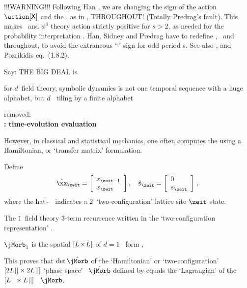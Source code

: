 \begin{description}
 {
                    {\color{red}
!!!WARNING!!!
Following Han , we are changing the sign of the
action $\action[\Xx]$ and the {\jacobianOrb}, as in ,
THROUGHOUT! (Totally Predrag's fault).
This makes \catlatt\ and {$\phi^4$} theory action strictly positive
for
${s}>2$, as
needed for the probability interpretation .
                    }
Han, Sidney and Predrag have to redefine
\templatt, \catlatt\ and \henlatt\ {\jacobianOrbs} throughout, to avoid the
extraneous `-' sign for odd period {\lattstate}s.
%
See also , and Pozrikidis
 eq.~(1.8.2).
    }

 {
Say: THE BIG DEAL is

for $d$\dmn\ field theory, symbolic dynamics is not one temporal sequence
with a huge alphabet, but $d$\dmn\ {\spt} tiling by a finite alphabet
   }

 {removed:\\
{\bf {\HillDet}: time-evolution evaluation}

However, in classical and statistical mechanics, one often computes the
{\HillDet} using a  Hamiltonian, or `transfer matrix' formulation.

Define
\[  %
\hat{\xx}_\zeit
=
\left[\begin{array}{l}
 {\ssp}_{\zeit-1}\\
 {\ssp}_\zeit
 \end{array}\right]
,\quad
\hat{\mathsf{\Ssym{}}}_\zeit
=
    \left[\begin{array}{l}
    {0}\\
 {\Ssym{}}_{\zeit}
 \end{array}\right]
\,,
\] %
where the hat $\hat{~}$~ indicates a $2$\dmn\
`two-configuration' lattice site $\zeit$ state.

The $1$\dmn\ field theory 3-term recurrence  written
in the \PV\rf{PerViv} `two-configuration representation'
.


$\mathbf{\jMorb}_1$ is the spatial
$[{L_{}}\!\times\!{L_{}}]$ {\jacobianOrb} of
$d=1$ \templatt\ form ,


This proves that $\det\hat{\mathbf{\jMorb}}$ of the
`Hamiltonian' or `two-configuration'
$[2{L_{}}{||}\times2{L_{}}{||}]$ `phase space'
\jacobianOrb\ $\hat{\mathbf{\jMorb}}$ defined by 
equals the `Lagrangian' {\HillDet} of the
$[{L_{}}{||}\times{\ensuremath{L_{}}}{\ensuremath{||}}]$ \jacobianOrb\
$\mathbf{\jMorb}$.

}
\end{description}
